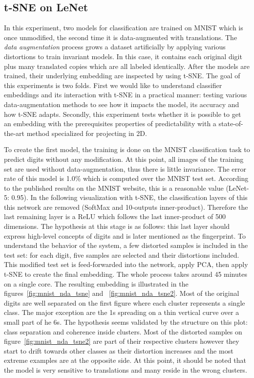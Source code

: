 \documentclass[a4paper,12pt]{report}
\begin{document}

\subsection{t-SNE on LeNet}

In this experiment, two models for classification are trained on MNIST which is once unmodified, the second time it is data-augmented with translations.
The {\em data augmentation} process grows a dataset artificially by applying various distortions to train invariant models.
In this case, it contains each original digit plus many translated copies which are all labeled identically.
After the models are trained, their underlying embedding are inspected by using t-SNE.
The goal of this experiments is two folds.
First we would like to understand classifier embeddings and its interaction with t-SNE in a practical manner: testing various data-augmentation methods to see how it impacts the model, its accuracy and how t-SNE adapts.
Secondly, this experiment tests whether it is possible to get an embedding with the prerequisites properties of predictability with a state-of-the-art method specialized for projecting in 2D.

To create the first model, the training is done on the MNIST classification task to predict digits without any modification.
At this point, all images of the training set are used without data-augmentation, thus there is little invariance.
The error rate of this model is 1.0\% which is computed over the MNIST test set.
According to the published results on the MNIST website, this is a reasonable value (LeNet-5: 0.95)\cite{mnist_web}.
In the following visualization with t-SNE, the classification layers of this this network are removed (SoftMax and 10-outputs inner-product).
Therefore the last remaining layer is a ReLU which follows the last inner-product of 500 dimensions.
The hypothesis at this stage is as follows: this last layer should express high-level concepts of digits and is later mentioned as the fingerprint.
To understand the behavior of the system, a few distorted samples is included in the test set: for each digit, five samples are selected and their distortions included.
This modified test set is feed-forwarded into the network, apply PCA, then apply t-SNE to create the final embedding.
The whole process takes around 45 minutes on a single core.
The resulting embedding is illustrated in the figures~\ref{fig:mnist_nda_tsne} and ~\ref{fig:mnist_nda_tsne2}.
Most of the original digits are well separated on the first figure where each cluster represents a single class.
The major exception are the 1s spreading on a thin vertical curve over a small part of he 6s.
The hypothesis seems validated by the structure on this plot: class separation and coherence inside clusters.
Most of the distorted samples on figure~\ref{fig:mnist_nda_tsne2} are part of their respective clusters however they start to drift towards other classes as their distortion increases and the most extreme examples are at the opposite side.
At this point, it should be noted that the model is very sensitive to translations and many reside in the wrong clusters.
\end{document}
